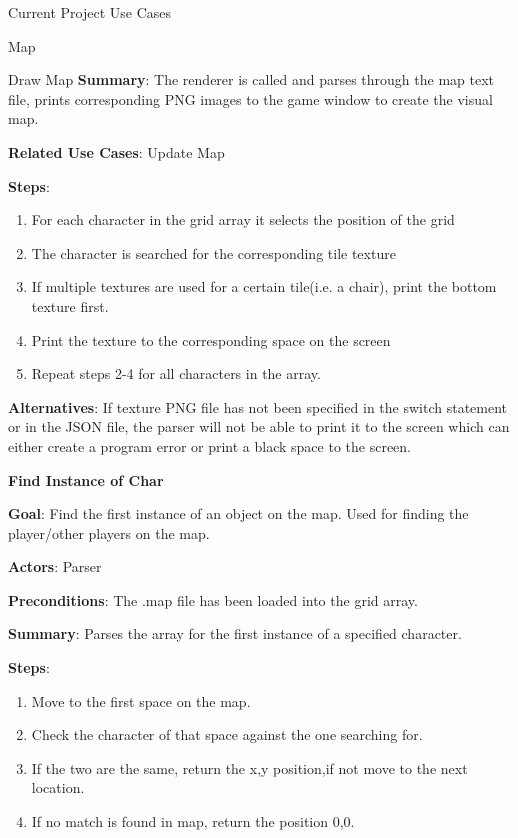 \documentclass[12pt]{report}
\begin{document}
\begin{chapter}{Current Project Use Cases}
\begin{section}{Map}
\begin{subsection}{Draw Map}
      \textbf{Summary}: 
      The renderer is called and parses through the map text file, prints corresponding PNG images to the game window to create the visual map.

      \textbf{Related Use Cases}: 
      Update Map

      \textbf{Steps}:
      \begin{enumerate}
	\item For each character in the grid array it selects the position of the grid
        \item The character is searched for the corresponding tile texture
	\item If multiple textures are used for a certain tile(i.e. a chair), print the bottom texture first.
	\item Print the texture to the corresponding space on the screen
	\item Repeat steps 2-4 for all characters in the array.
      \end{enumerate}

      \textbf{Alternatives}: 
      If texture PNG file has not been specified in the switch statement or in the JSON file, the parser will not be able to print it to the screen which can either create a program error or print a black space to the screen.

      \textbf{Find Instance of Char}

      \textbf{Goal}: 
      Find the first instance of an object on the map. Used for finding the player/other players on the map.

      \textbf{Actors}: 
      Parser

      \textbf{Preconditions}: 
      The .map file has been loaded into the grid array.

      \textbf{Summary}: 
      Parses the array for the first instance of a specified character.

      \textbf{Steps}:
      \begin{enumerate}
	\item Move to the first space on the map.
	\item Check the character of that space against the one searching for.
	\item If the two are the same, return the x,y position,if not move to the next location.
	\item If no match is found in map, return the position 0,0.
      \end{enumerate}
    \end{subsection}


\end{section}
\end{chapter}
\end{document}
